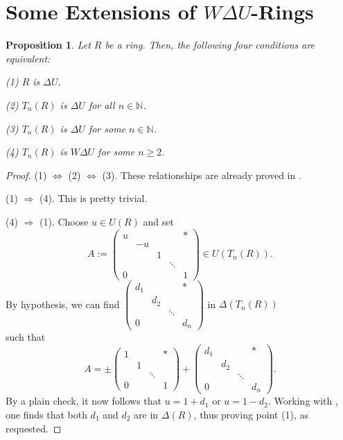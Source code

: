 \documentclass[12pt]{amsart}
\newtheorem{proposition}[theorem]{Proposition}
\theoremstyle{definition}
\begin{document}
\section{Some Extensions of $W\Delta U$-Rings}

\begin{proposition}
Let \( R \) be a ring. Then, the following four conditions are equivalent:

(1) \( R \) is $\Delta U$.

(2) \( T_n(R) \) is $\Delta U$ for all \( n \in \mathbb{N} \).

(3) \( T_n(R) \) is $\Delta U$ for some \( n \in \mathbb{N} \).

(4) \( T_n(R) \) is $W\Delta U$ for some \( n \geq 2 \).
\end{proposition}

\begin{proof}
(1) \( \Leftrightarrow \) (2) \( \Leftrightarrow \) (3). These relationships are already proved in \cite[Corollary 2.9]{7}.

(1) \( \Rightarrow \) (4). This is pretty trivial.

(4) \( \Rightarrow \) (1). Choose $u\in U(R)$ and set
$$A:=\begin{pmatrix}
	u & & & & \ast \\
	& -u & & & \\
	& & 1 & & \\
	& & & \ddots & \\
	0 & & & & 1
\end{pmatrix}\in U(T_n(R)).$$ By hypothesis, we can find
$\begin{pmatrix}
	d_{1} & & & \ast \\
	& d_{2} & & \\
	& & \ddots & \\
	0 & & & d_{n}
\end{pmatrix}$ in $\Delta(T_n(R))$ \\
such that
$$A=\pm \begin{pmatrix}
	1 & & & \ast \\
	& 1 & & \\
	& & \ddots & \\
	0 & & & 1
\end{pmatrix}+\begin{pmatrix}
	d_{1} & & & \ast \\
	& d_{2} & & \\
	& & \ddots & \\
	0 & & & d_{n}
\end{pmatrix}.$$
By a plain check, it now follows that $u=1+d_1$ or $u=1-d_2$. Working with \cite[Corollary 9(1)]{2}, one finds that both $d_1$ and $d_2$ are in $\Delta(R)$, thus proving point (1), as requested.
\end{proof}
\end{document}
